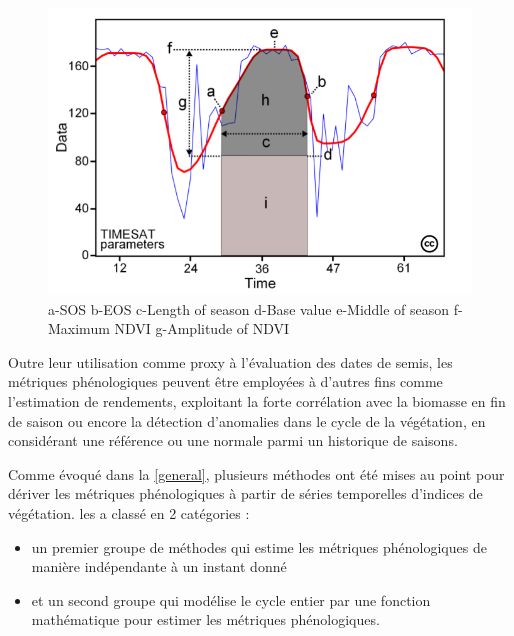 \begin{figure}[t]
 \begin{center}
  \includegraphics[scale=0.45]{synthese_biblio/metrics.png} 
 \end{center}
 \caption{a-SOS b-EOS c-Length of season d-Base value e-Middle of season f-Maximum NDVI g-Amplitude of NDVI \citep{Eklundh2017}}
 \label{metrics}
\end{figure}
\vspace{5mm}

Outre leur utilisation comme proxy à l'évaluation des dates de semis, les métriques phénologiques peuvent être employées à d'autres fins comme l'estimation de rendements, exploitant 
la forte corrélation avec la biomasse en fin de saison ou encore la détection d'anomalies dans le cycle de la végétation, en considérant une référence ou une normale parmi un 
historique de saisons.

\vspace{5mm}

Comme évoqué dans la \cref{general}, plusieurs méthodes ont été mises au point pour dériver les métriques phénologiques à partir de séries temporelles d'indices de végétation.
\citep{Atzberger2013} les a classé en 2 catégories : 
\begin{itemize}
 \item un premier groupe de méthodes qui estime les métriques phénologiques de manière indépendante à un instant donné 
 \item et un second groupe qui modélise le cycle entier par une fonction mathématique pour estimer les métriques phénologiques.
\end{itemize}

